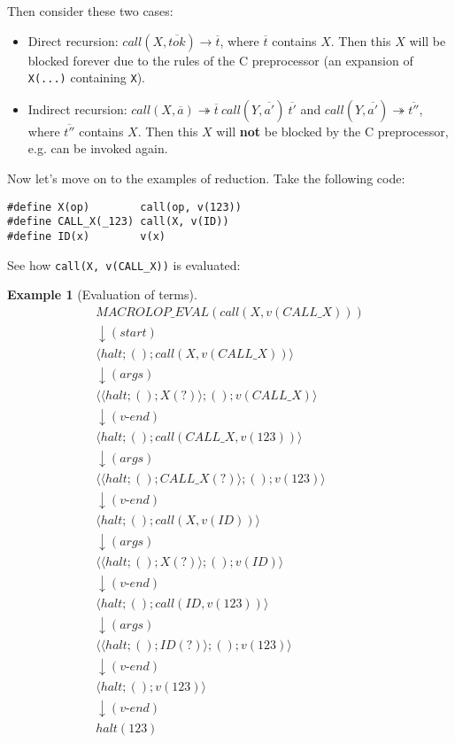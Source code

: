 \documentclass[12pt]{article}
\theoremstyle{break}
\newtheorem{example}{Example}
\begin{document}
Then consider these two cases:

\begin{itemize}
    \item Direct recursion: $call(X, \overline{tok}) \to \overline{t}$, where
    $\overline{t}$ contains $X$. Then this $X$ will be blocked forever due to the
    rules of the C preprocessor (an expansion of \texttt{X(...)} containing
    \texttt{X}).

    \item Indirect recursion: $call(X, \overline{a}) \twoheadrightarrow
    \overline{t} \ call(Y, \overline{a'}) \ \overline{t'}$ and
    $call(Y, \overline{a'}) \twoheadrightarrow \overline{t''}$, where $\overline{t''}$
    contains $X$. Then this $X$ will \textbf{not} be blocked by the C preprocessor,
    e.g. can be invoked again.
\end{itemize}

Now let's move on to the examples of reduction. Take the following code:

\begin{verbatim}
#define X(op)        call(op, v(123))
#define CALL_X(_123) call(X, v(ID))
#define ID(x)        v(x)
\end{verbatim}

See how \texttt{call(X, v(CALL\_X))} is evaluated:

\begin{example}[Evaluation of terms]
\small
\begin{gather*}
    MACROLOP\_EVAL(call(X, v(CALL\_X))) \\
    \downarrow (start) \\
    \langle halt; (); call(X, v(CALL\_X)) \rangle \\
    \downarrow (args) \\
    \langle \langle halt; (); X(?) \rangle; (); v(CALL\_X) \rangle \\
    \downarrow (v\mbox{-}end) \\
    \langle halt; (); call(CALL\_X, v(123)) \rangle \\
    \downarrow (args) \\
    \langle \langle halt; (); CALL\_X(?) \rangle; (); v(123) \rangle \\
    \downarrow (v\mbox{-}end) \\
    \langle halt; (); call(X, v(ID)) \rangle \\
    \downarrow (args) \\
    \langle \langle halt; (); X(?) \rangle; (); v(ID) \rangle \\
    \downarrow (v\mbox{-}end) \\
    \langle halt; (); call(ID, v(123)) \rangle \\
    \downarrow (args) \\
    \langle \langle halt; (); ID(?) \rangle; (); v(123) \rangle \\
    \downarrow (v\mbox{-}end) \\
    \langle halt; (); v(123) \rangle \\
    \downarrow (v\mbox{-}end) \\
    halt(123)
\end{gather*}
\normalsize
\end{example}
\end{document}
